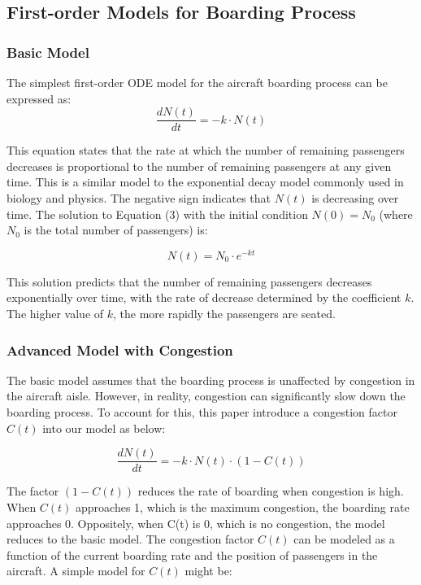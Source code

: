\documentclass[12pt]{article}
\begin{document}
\subsection{First-order Models for Boarding Process}
\subsubsection{Basic Model}

The simplest first-order ODE model for the aircraft boarding process can be expressed as:
\begin{equation}
\frac{dN(t)}{dt} = -k \cdot N(t)
\end{equation}

This equation states that the rate at which the number of remaining passengers decreases is proportional to the number of remaining passengers at any given time. This is a similar model to the exponential decay model commonly used in biology and physics. The negative sign indicates that $N(t)$ is decreasing over time. The solution to Equation (3) with the initial condition $N(0) = N_0$ (where $N_0$ is the total number of passengers) is:

\begin{equation}
N(t) = N_0 \cdot e^{-kt}
\end{equation}

This solution predicts that the number of remaining passengers decreases exponentially over time, with the rate of decrease determined by the coefficient $k$. The higher value of $k$, the more rapidly the passengers are seated.

\subsubsection{Advanced Model with Congestion}

The basic model assumes that the boarding process is unaffected by congestion in the aircraft aisle. However, in reality, congestion can significantly slow down the boarding process. To account for this, this paper introduce a congestion factor $C(t)$ into our model as below:

\begin{equation}
\frac{dN(t)}{dt} = -k \cdot N(t) \cdot (1 - C(t))
\end{equation}

The factor $(1 - C(t))$ reduces the rate of boarding when congestion is high. When $C(t)$ approaches 1, which is the maximum congestion, the boarding rate approaches 0. Oppositely, when C(t) is 0, which is no congestion, the model reduces to the basic model. The congestion factor $C(t)$ can be modeled as a function of the current boarding rate and the position of passengers in the aircraft. A simple model for $C(t)$ might be:
\end{document}
